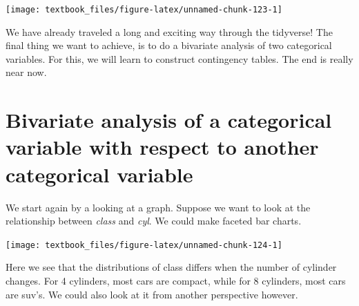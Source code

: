 \documentclass[]{tufte-book}
\newenvironment{Shaded}{}{}
\newcommand{\KeywordTok}[1]{\textcolor[rgb]{0.00,0.44,0.13}{\textbf{#1}}}
\newcommand{\NormalTok}[1]{#1}
\newcommand{\OperatorTok}[1]{\textcolor[rgb]{0.40,0.40,0.40}{#1}}
\newcommand{\StringTok}[1]{\textcolor[rgb]{0.25,0.44,0.63}{#1}}
\begin{document}
\texttt{[image: textbook\_files/figure-latex/unnamed-chunk-123-1]}

We have already traveled a long and exciting way through the tidyverse! The final thing we want to achieve, is to do a bivariate analysis of two categorical variables. For this, we will learn to construct contingency tables. The end is really near now.

\hypertarget{bivariate-analysis-of-a-categorical-variable-with-respect-to-another-categorical-variable}{%
\section{Bivariate analysis of a categorical variable with respect to another categorical variable}\label{bivariate-analysis-of-a-categorical-variable-with-respect-to-another-categorical-variable}}

We start again by a looking at a graph. Suppose we want to look at the relationship between \emph{class} and \emph{cyl}. We could make faceted bar charts.

\begin{Shaded}
\end{Shaded}

\texttt{[image: textbook\_files/figure-latex/unnamed-chunk-124-1]}

Here we see that the distributions of class differs when the number of cylinder changes. For 4 cylinders, most cars are compact, while for 8 cylinders, most cars are suv's. We could also look at it from another perspective however.

\begin{Shaded}
\end{Shaded}
\end{document}
